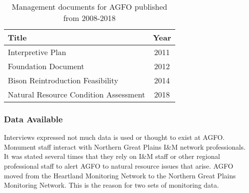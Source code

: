 \begin{table}[h]
	\centering
\caption[AGFO management documents]
	{Management documents for AGFO published from 2008-2018} 
\label{tab:AGFOManDocs}
	\begin{tabular}{lc}
		\toprule
		Title & Year\tabularnewline
		\midrule
		Interpretive Plan & 2011 \tabularnewline
		Foundation Document & 2012 \tabularnewline
		Bison Reintroduction Feasibility & 2014 \tabularnewline
		Natural Resource Condition Assessment & 2018 \tabularnewline
		\bottomrule
	\end{tabular}
\end{table}

\subsubsection{Data Available}

Interviews expressed not much data is used or thought to exist at AGFO.
Monument staff interact with Northern Great Plains I\&M network professionals. 
It was stated several times that they rely on I\&M staff or other regional professional staff to alert AGFO to natural resource issues that arise. 
AGFO moved from the Heartland Monitoring Network to the Northern Great Plains Monitoring Network. 
This is the reason for two sets of monitoring data.

